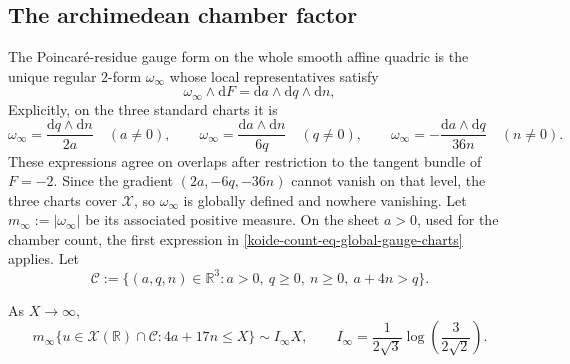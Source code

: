 \subsection{The archimedean chamber factor}
\label{koide-count-subsec-archimedean}

The Poincar\'e-residue gauge form on the whole smooth affine quadric is the
unique regular \(2\)-form \(\omega_\infty\) whose local representatives
satisfy
\begin{equation}
 \omega_\infty\wedge\mathrm dF
 =\mathrm da\wedge\mathrm dq\wedge\mathrm dn,
 \label{koide-count-eq-gauge-form}
\end{equation}
Explicitly, on the three standard charts it is
\begin{equation}
 \omega_\infty
 =\frac{\mathrm dq\wedge\mathrm dn}{2a}\quad(a\neq0),
 \qquad
 \omega_\infty
 =\frac{\mathrm da\wedge\mathrm dn}{6q}\quad(q\neq0),
 \qquad
 \omega_\infty
 =-\frac{\mathrm da\wedge\mathrm dq}{36n}\quad(n\neq0).
 \label{koide-count-eq-global-gauge-charts}
\end{equation}
These expressions agree on overlaps after restriction to the tangent bundle
of \(F=-2\).  Since the gradient
\((2a,-6q,-36n)\) cannot vanish on that level, the three charts cover
\(\mathscr X\), so \(\omega_\infty\) is globally defined and nowhere
vanishing.  Let \(m_\infty:=|\omega_\infty|\) be its associated positive
measure.  On the sheet \(a>0\), used for the chamber count, the first
expression in \eqref{koide-count-eq-global-gauge-charts} applies.
Let
\begin{equation}
 \mathcal C:=
 \{(a,q,n)\in\mathbb R^3:a>0,\ q\geq0,\ n\geq0,\ a+4n>q\}.
 \label{koide-count-eq-real-chamber}
\end{equation}

\begin{theorem}
\label{koide-count-thm-archimedean-factor}
As \(X\to\infty\),
\begin{equation}
 m_\infty\{u\in\mathscr X(\mathbb R)\cap\mathcal C:
              4a+17n\leq X\}
 \sim I_\infty X,
 \qquad
 I_\infty=\frac1{2\sqrt3}
 \log\!\left(\frac3{2\sqrt2}\right).
 \label{koide-count-eq-archimedean-asymptotic}
\end{equation}
\end{theorem}


